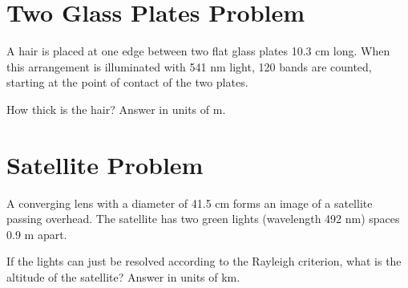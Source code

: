 \documentclass[../physics12.tex]{subfiles}
\begin{document}
\section{Two Glass Plates Problem}
A hair is placed at one edge between two flat glass plates 10.3 cm long. When this arrangement is illuminated with 541 nm light, 120 bands are counted, starting at the point of contact of the two plates.

How thick is the hair? Answer in units of m.

\section{Satellite Problem}
A converging lens with a diameter of 41.5 cm forms an image of a satellite passing overhead. The satellite has two green lights (wavelength 492 nm) spaces 0.9 m apart. 

If the lights can just be resolved according to the Rayleigh criterion, what is the altitude of the satellite? Answer in units of km.
\end{document}
